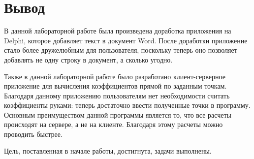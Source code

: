 \documentclass[a4paper, 14pt]{extarticle}
\begin{document}
\section{Вывод}

В данной лабораторной работе была произведена доработка приложения на
\foreignlanguage{english}{Delphi}, которое добавляет текст в документ
\foreignlanguage{english}{Word}. После доработки приложение стало более
дружелюбным для пользователя, поскольку теперь оно позволяет добавлять не одну
строку в документ, а сколько угодно.

Также в данной лабораторной работе было разработано клиент-серверное приложение
для вычисления коэффициентов прямой по заданным точкам. Благодаря данному
приложению пользователям нет необходимости считать коэффициенты руками: теперь
достаточно ввести полученные точки в программу. Основным преимуществом данной
программы является то, что все расчеты происходят на сервере, а не на клиенте.
Благодаря этому расчеты можно проводить быстрее.

Цель, поставленная в начале работы, достигнута, задачи выполнены.
\end{document}
